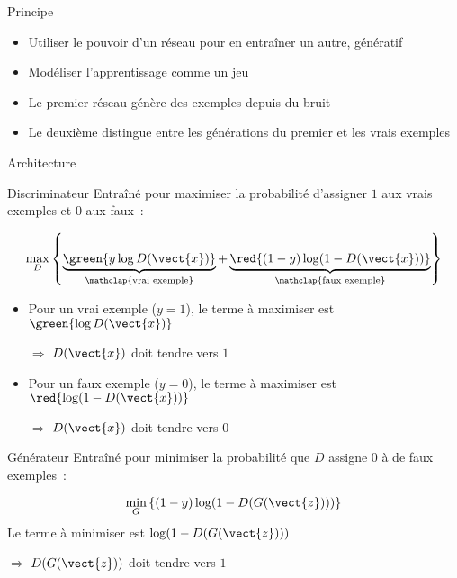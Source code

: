 \begin{frame}{Principe}
  \begin{itemize}[<+->]
    \item Utiliser le pouvoir d'un réseau pour en entraîner un autre, génératif
    \item Modéliser l'apprentissage comme un jeu
    \item Le premier réseau génère des exemples depuis du bruit
    \item Le deuxième distingue entre les générations du premier et les vrais exemples
  \end{itemize}
\end{frame}

\begin{frame}{Architecture}
\end{frame}

\begin{frame}{Discriminateur}
  Entraîné pour maximiser la probabilité d'assigner $1$ aux vrais exemples et $0$ aux faux~:

  \[
    \max_D
      \left\{
        \underbrace{\green{y \log D(\vect{x})}}_{\mathclap{\text{vrai exemple}}}
        +
        \underbrace{\red{(1 - y) \log (1 - D(\vect{x}))}}_{\mathclap{\text{faux exemple}}}
      \right\}
  \]

  \begin{itemize}[<+(1)->]
    \item Pour un vrai exemple ($y=1$), le terme à maximiser est $\green{\log D(\vect{x})}$

    $\Rightarrow$ $D(\vect{x})$ doit tendre vers $1$
    \item Pour un faux exemple ($y=0$), le terme à maximiser est $\red{\log (1 - D(\vect{x}))}$

    $\Rightarrow$ $D(\vect{x})$ doit tendre vers $0$
  \end{itemize}
\end{frame}

\begin{frame}{Générateur}
  Entraîné pour minimiser la probabilité que $D$ assigne $0$ à de faux exemples~:

  \[
    \min_G
      \left\{
        (1 - y) \log (1 - D(G(\vect{z})))
      \right\}
  \]
  Le terme à minimiser est $\log (1 - D(G(\vect{z})))$

  $\Rightarrow$ $D(G(\vect{z}))$ doit tendre vers $1$
\end{frame}

